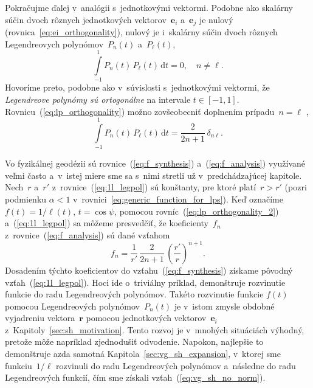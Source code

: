 \documentclass[a4paper, 12pt]{book}
\newcommand{\diff}{\mathrm d}
\let\vec\mathbf
\begin{document}
Pokračujme ďalej v~analógii s~jednotkovými vektormi.  Podobne ako skalárny 
súčin dvoch rôznych jednotkových vektorov~$\vec e_i$ a~$ \vec e_j$ je nulový 
(rovnica~\ref{eq:ei_orthogonality}), nulový je i~skalárny súčin dvoch rôznych 
Legendreovych polynómov~$P_n(t)$ a~$P_\ell(t)$,
%
\begin{equation}
\label{eq:lp_orthogonality}
\int\limits_{-1}^1 P_n(t) \, P_\ell(t) \, \diff t = 0{,} \quad n \neq \ell{.}
\end{equation}
%
Hovoríme preto, podobne ako v~súvislosti s~jednotkovými vektormi, že
\emph{Legendreove polynómy sú ortogonálne} na intervale $t \in [-1, 1].$
Rovnicu~(\ref{eq:lp_orthogonality}) možno zovšeobecniť doplnením prípadu~$n
= \ell$ \parencite[napríklad][]{Hobson},
%
\begin{equation}
\label{eq:lp_orthogonality_2}
\int\limits_{-1}^1 P_n(t) \, P_\ell(t) \, \diff t = \frac{2}{2n + 1} \, 
\delta_{n\ell}{.}
\end{equation}

Vo fyzikálnej geodézii sú rovnice~(\ref{eq:f_synthesis}) 
a~(\ref{eq:f_analysis}) využívané veľmi často a~v~istej miere sme sa s~nimi 
stretli už v~predchádzajúcej kapitole.  Nech~$r$ a~$r'$ 
z~rovnice~(\ref{eq:1l_legpol}) sú konštanty, pre ktoré platí~$r > r'$ (pozri 
podmienku $\alpha < 1$ v~rovnici~\ref{eq:generic_function_for_lps}).  Keď 
označíme $f(t) = 1 \slash \ell(t)$, $t = \cos\psi$, pomocou 
rovníc~(\ref{eq:lp_orthogonality_2}) a~(\ref{eq:1l_legpol}) sa môžeme 
presvedčiť, že koeficienty~$f_n$ z~rovnice~(\ref{eq:f_analysis}) sú dané 
vzťahom
%
\begin{equation}
f_n = \frac{1}{r'} \, \frac{2}{2n + 1} \, \left( \frac{r'}{r} \right)^{n
+ 1}{.}
\end{equation}
%
Dosadením týchto koeficientov do vzťahu~(\ref{eq:f_synthesis}) získame pôvodný 
vzťah~(\ref{eq:1l_legpol}).  Hoci ide o~triviálny príklad, demonštruje 
rozvinutie funkcie do radu Legendreových polynómov.  Takéto rozvinutie funkcie 
$f(t)$ pomocou Legendreových polynómov~$P_n(t)$ je v~istom zmysle obdobné 
vyjadreniu vektora~$\vec r$ pomocou jednotkových vektorov~$\vec e_i$ 
z~Kapitoly~\ref{sec:sh_motivation}.  Tento rozvoj je v~mnohých situáciách 
výhodný, pretože môže napríklad zjednodušiť odvodenie.  Napokon, najlepšie to 
demonštruje azda samotná Kapitola~\ref{sec:vg_sh_expansion}, v~ktorej sme 
funkciu~$1 \slash \ell$ rozvinuli do radu Legendreových polynómov a~následne do 
radu Legendreových funkcií, čím sme získali vzťah~(\ref{eq:vg_sh_no_norm}).
\end{document}
